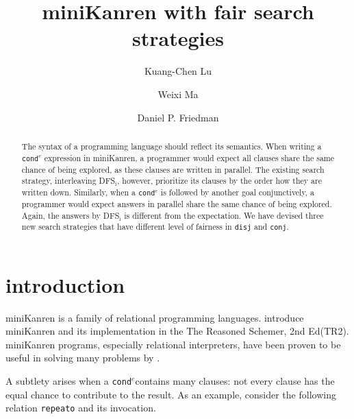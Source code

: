 \documentclass[format=acmlarge, review=true, authordraft=true]{acmart}
\title{miniKanren with fair search strategies}
\author{Kuang-Chen Lu}
\affiliation{Indiana University}
\author{Weixi Ma}
\affiliation{Indiana University}
\author{Daniel P. Friedman}
\affiliation{Indiana University}
\newcommand{\conde}{\texttt{cond$^e$}}
\newcommand{\conj}{\texttt{conj}}
\newcommand{\disj}{\texttt{disj}}
\newcommand{\DFSi}[0]{DFS$_\textrm{i}$}
\begin{document}
\begin{abstract}

The syntax of a programming language should reflect its semantics. When writing 
a \conde{} expression in miniKanren, a programmer would expect all clauses 
share the same chance of being explored, as these clauses are written in 
parallel. The existing search strategy, interleaving \DFSi{}, 
however, prioritize its clauses by the order how they are written down. 
Similarly, when a \conde{} is followed by another goal conjunctively, a 
programmer would expect answers in parallel share the same chance of being 
explored. Again, the answers by \DFSi{} is different from the 
expectation. We have devised three new search strategies that have different 
level of fairness in \disj{} and \conj{}.


\end{abstract}

\maketitle

\section{introduction}

miniKanren is a family of relational programming languages.
\citet{friedman_reasoned_2018} introduce miniKanren and its implementation
in the The Reasoned Schemer, 2nd Ed(TR2). miniKanren programs, especially
relational interpreters, have been proven to be useful in solving many problems 
by \citet{byrd2017unified}. 

A subtlety arises when a \conde contains many clauses: not every clause has the 
equal chance to contribute to the result. As an example, consider the following 
relation \texttt{repeato} and its invocation. 
\end{document}
